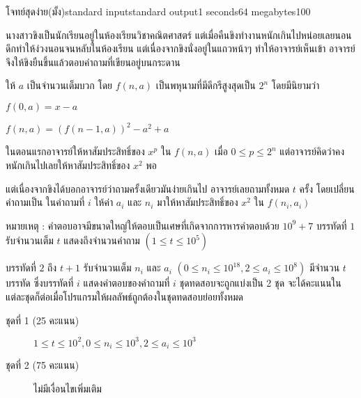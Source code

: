 \documentclass[11pt,a4paper]{article}
\begin{document}
\begin{problem}{โจทย์สุดง่าย(มั้ง)}{standard input}{standard output}{1 seconds}{64 megabytes}{100}

นางสาวขิงเป็นนักเรียนอยู่ในห้องเรียนวิชาคณิตศาสตร์ แต่เมื่อคืนขิงทำงานหนักเกินไปหน่อยเลยนอนดึกทำให้ง่วงนอนจนหลับในห้องเรียน แต่เนื่องจากขิงนั่งอยู่ในแถวหน้าๆ ทำให้อาจารย์เห็นเข้า อาจารย์จึงให้ขิงยืนขึ้นแล้วตอบคำถามที่เขียนอยู่บนกระดาน

ให้ $a$ เป็นจำนวนเต็มบวก โดย $f(n , a)$ เป็นพหุนามที่มีดีกรีสูงสุดเป็น $2^{n}$ โดยมีนิยามว่า 
\begin{center}

$f(0 , a) = x - a$ 

$f(n , a) = (f(n-1 , a))^2 - a^2 + a$  

\end{center}

ในตอนแรกอาจารย์ให้หาสัมประสิทธิ์ของ $x^p$ ใน $f(n , a)$ เมื่อ $0 \leq p \leq 2^n$ แต่อาจารย์คิดว่าคงหนักเกินไปเลยให้หาสัมประสิทธิ์ของ $x^2$ พอ

แต่เนื่องจากขิงได้บอกอาจารย์ว่าถามครั้งเดียวมันง่ายเกินไป อาจารย์เลยถามทั้งหมด $t$ ครั้ง โดยเปลี่ยนคำถามเป็น
ในคำถามที่ $i$ ให้ค่า $a_i$ และ $n_i$ มาให้หาสัมประสิทธิ์ของ $x^2$ ใน $f(n_i , a_i)$ 

หมายเหตุ : คำตอบอาจมีขนาดใหญ่ให้ตอบเป็นเศษที่เกิดจากการหารคำตอบด้วย $10^9 + 7$
\InputFile
บรรทัดที่ $1$ รับจำนวนเต็ม $t$ แสดงถึงจำนวนคำถาม $(1 \leq t \leq 10^5)$

บรรทัดที่ $2$ ถึง $t + 1$ รับจำนวนเต็ม $n_i$ และ $a_i$ $(0 \leq n_i \leq10^{18} , 2 \leq a_i \leq 10^8)$
\OutputFile
มีจำนวน $t$ บรรทัด ซึ่งบรรทัดที่ $i$ แสดงคำตอบของคำถามที่ $i$ 
\Scoring
ชุดทดสอบจะถูกแบ่งเป็น 2 ชุด จะได้คะแนนในแต่ละชุดก็ต่อเมื่อโปรแกรมให้ผลลัพธ์ถูกต้องในชุดทดสอบย่อยทั้งหมด

\begin{description}

\item[ชุดที่ 1 (25 คะแนน)]  $1 \leq t \leq 10^2 , 0 \leq n_i \leq 10^3 , 2 \leq a_i \leq 10^3$ 

\item[ชุดที่ 2 (75 คะแนน)] ไม่มีเงื่อนไขเพิ่มเติม

\end{description}

\Examples

\begin{example}
%
%
\end{example}

\end{problem}
\end{document}
